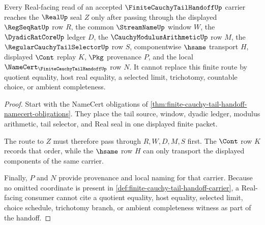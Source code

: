 \begin{theorem}
\label{thm:finite-cauchy-tail-handoff-real-seal-route}
Every Real-facing read of an accepted $\FiniteCauchyTailHandoffUp$ carrier reaches the $\RealUp$ seal $Z$ only after passing through the displayed $\RegSeqRatUp$ row $R$, the common $\StreamNameUp$ window $W$, the $\DyadicRatCoreUp$ ledger $D$, the $\CauchyModulusArithmeticUp$ row $M$, the $\RegularCauchyTailSelectorUp$ row $S$, componentwise $\hsame$ transport $H$, displayed $\Cont$ replay $K$, $\Pkg$ provenance $P$, and the local $\NameCert_{\FiniteCauchyTailHandoffUp}$ row $N$. It cannot replace this finite route by quotient equality, host real equality, a selected limit, trichotomy, countable choice, or ambient completeness.
\end{theorem}
\begin{proof}
Start with the NameCert obligations of \autoref{thm:finite-cauchy-tail-handoff-namecert-obligations}. They place the tail source, window, dyadic ledger, modulus arithmetic, tail selector, and Real seal in one displayed finite packet.

The route to $Z$ must therefore pass through $R,W,D,M,S$ first. The $\Cont$ row $K$ records that order, while the $\hsame$ row $H$ can only transport the displayed components of the same carrier.

Finally, $P$ and $N$ provide provenance and local naming for that carrier. Because no omitted coordinate is present in \autoref{def:finite-cauchy-tail-handoff-carrier}, a Real-facing consumer cannot cite a quotient equality, host equality, selected limit, choice schedule, trichotomy branch, or ambient completeness witness as part of the handoff.
\end{proof}


\begin{closurestatus}{\FiniteCauchyTailHandoffUp}
  \theoryclosure{\seedClosure}
  \formalstatus{\formalTargetV}
\end{closurestatus}

